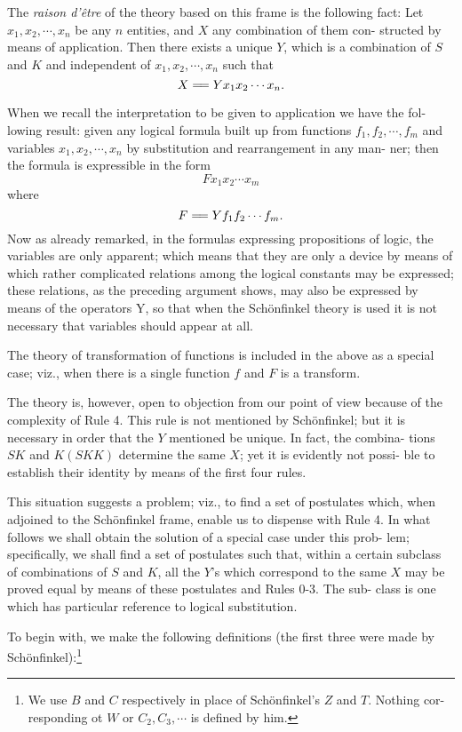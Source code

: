\documentclass[10pt, twoside]{extarticle}
\newcommand{\td}[2][] {\todo[tickmarkheight=3pt, inline, size=\tiny, #1]{#2}}
\newcommand\longeq{=\joinrel=}
\theoremstyle{breaktheorem}
\theoremstyle{mylemma}
\theoremstyle{mydefinition}
\theoremstyle{mycorollary}
\begin{document}
The \textit{raison d'être} of the theory based on this frame is the following fact:
Let \(x_1, x_2,\cdots, x_n\) be any \(n\) entities, and \(X\) any combination of them con-
structed by means of application. Then there exists a unique \(Y\), which is a
combination of \(S\) and \(K\) and independent of \(x_1, x_2,\cdots, x_n\) such that
\[X \longeq Y x_1 x_2 \cdots x_n.\]

When we recall the interpretation to be given to application we have the fol-
lowing result: given any logical formula built up from functions \(f_1, f_2,\cdots, f_m\)
and variables \(x_1, x_2,\cdots, x_n\) by substitution and rearrangement in any man-
ner; then the formula is expressible in the form
\[Fx_1x_2\cdots x_m\]
where
\[F\longeq Yf_1f_2\cdots f_m.\]
Now as already remarked, in the formulas expressing propositions of logic,
the variables are only apparent; which means that they are only a device by
means of which rather complicated relations among the logical constants
may be expressed; these relations, as the preceding argument shows, may also
be expressed by means of the operators Y, so that when the Schönfinkel theory
is used it is not necessary that variables should appear at all.

The theory of transformation of functions is included in the above as a
special case; viz., when there is a single function \(f\) and \(F\) is a transform.

The theory is, however, open to objection from our point of view because
of the complexity of Rule 4\td{link}. This rule is not mentioned by Schönfinkel; but
it is necessary in order that the \(Y\) mentioned be unique. In fact, the combina-
tions \(SK\) and \(K(SKK)\) determine the same \(X\); yet it is evidently not possi-
ble to establish their identity by means of the first four rules.

This situation suggests a problem; viz., to find a set of postulates which,
when adjoined to the Schönfinkel frame, enable us to dispense with Rule 4.
In what follows we shall obtain the solution of a special case under this prob-
lem; specifically, we shall find a set of postulates such that, within a certain
subclass of combinations of \(S\) and \(K\), all the \(Y\)'s which correspond
to the same \(X\) may be proved equal by means of these postulates and Rules 0-3. The sub-
class is one which has particular reference to logical substitution.

To begin with, we make the following definitions (the first three were made by Schönfinkel):\footnote{We use \(B\) and \(C\) respectively in place of Schönfinkel's \(Z\) and \(T\). Nothing cor- responding ot \(W\) or \(C_2, C_3, \cdots\) is defined by him.}
\end{document}
